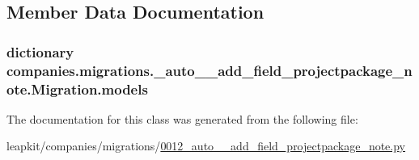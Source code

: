 \subsection{Member Data Documentation}
\hypertarget{classcompanies_1_1migrations_1_10012__auto____add__field__projectpackage__note_1_1_migration_a4c3c5cb5f9fcfb7ba2004fb24b7a0ec9}{
\subsubsection[{models}]{\setlength{\rightskip}{0pt plus 5cm}dictionary companies.\-migrations.\-\_\-auto\-\_\-\-\_\-add\-\_\-field\-\_\-projectpackage\-\_\-note.\-Migration.\-models\hspace{0.3cm}{\ttfamily [static]}}}\label{classcompanies_1_1migrations_1_10012__auto____add__field__projectpackage__note_1_1_migration_a4c3c5cb5f9fcfb7ba2004fb24b7a0ec9}


The documentation for this class was generated from the following file\-:\begin{DoxyCompactItemize}
\item 
leapkit/companies/migrations/\hyperlink{0012__auto____add__field__projectpackage__note_8py}{0012\-\_\-auto\-\_\-\-\_\-add\-\_\-field\-\_\-projectpackage\-\_\-note.\-py}\end{DoxyCompactItemize}
